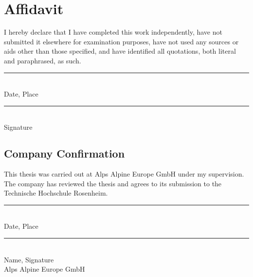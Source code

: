 \chapter*{Affidavit}

I hereby declare that I have completed this work independently, have not
submitted it elsewhere for examination purposes, have not used any sources or
aids other than those specified, and have identified all quotations, both
literal and paraphrased, as such.

\vspace{2.5cm}

\noindent
\begin{minipage}[t]{0.42\textwidth}
  \rule{\linewidth}{0.4pt}\\
  Date, Place
\end{minipage}%
\hfill
\begin{minipage}[t]{0.42\textwidth}
  \rule{\linewidth}{0.4pt}\\
  Signature
\end{minipage}

\vspace{2cm}

\section*{Company Confirmation}

This thesis was carried out at Alps Alpine Europe GmbH under my supervision.
The company has reviewed the thesis and agrees to its submission to the
Technische Hochschule Rosenheim.

\vspace{2.5cm}

\noindent
\begin{minipage}[t]{0.42\textwidth}
  \rule{\linewidth}{0.4pt}\\
  Date, Place
\end{minipage}%
\hfill
\begin{minipage}[t]{0.42\textwidth}
  \rule{\linewidth}{0.4pt}\\
  Name, Signature\\
  Alps Alpine Europe GmbH
\end{minipage}
